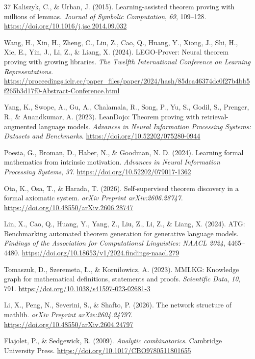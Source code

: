 \documentclass[pdflatex,sn-basic,Numbered]{sn-jnl}
\begin{document}
\begin{thebibliography}{37}
 Kaliszyk, C., \& Urban, J. (2015). Learning-assisted theorem proving with millions of lemmas. \emph{Journal of Symbolic Computation}, \emph{69}, 109--128. \url{https://doi.org/10.1016/j.jsc.2014.09.032}

 Wang, H., Xin, H., Zheng, C., Liu, Z., Cao, Q., Huang, Y., Xiong, J., Shi, H., Xie, E., Yin, J., Li, Z., \& Liang, X. (2024). LEGO-Prover: Neural theorem proving with growing libraries. \emph{The Twelfth International Conference on Learning Representations}. \url{https://proceedings.iclr.cc/paper_files/paper/2024/hash/85dca46374dc0f27b4bb5f265b3d17f0-Abstract-Conference.html}

 Yang, K., Swope, A., Gu, A., Chalamala, R., Song, P., Yu, S., Godil, S., Prenger, R., \& Anandkumar, A. (2023). LeanDojo: Theorem proving with retrieval-augmented language models. \emph{Advances in Neural Information Processing Systems: Datasets and Benchmarks}. \url{https://doi.org/10.52202/075280-0944}

 Poesia, G., Broman, D., Haber, N., \& Goodman, N. D. (2024). Learning formal mathematics from intrinsic motivation. \emph{Advances in Neural Information Processing Systems}, \emph{37}. \url{https://doi.org/10.52202/079017-1362}

 Ota, K., Osa, T., \& Harada, T. (2026). Self-supervised theorem discovery in a formal axiomatic system. \emph{arXiv Preprint arXiv:2606.28747}. \url{https://doi.org/10.48550/arXiv.2606.28747}

 Lin, X., Cao, Q., Huang, Y., Yang, Z., Liu, Z., Li, Z., \& Liang, X. (2024). ATG: Benchmarking automated theorem generation for generative language models. \emph{Findings of the Association for Computational Linguistics: NAACL 2024}, 4465--4480. \url{https://doi.org/10.18653/v1/2024.findings-naacl.279}

 Tomaszuk, D., Szeremeta, \L{}., \& Korni\l{}owicz, A. (2023). MMLKG: Knowledge graph for mathematical definitions, statements and proofs. \emph{Scientific Data}, \emph{10}, 791. \url{https://doi.org/10.1038/s41597-023-02681-3}

 Li, X., Peng, N., Severini, S., \& Shafto, P. (2026). The network structure of mathlib. \emph{arXiv Preprint arXiv:2604.24797}. \url{https://doi.org/10.48550/arXiv.2604.24797}

 Flajolet, P., \& Sedgewick, R. (2009). \emph{Analytic combinatorics}. Cambridge University Press. \url{https://doi.org/10.1017/CBO9780511801655}


\end{thebibliography}
\end{document}
